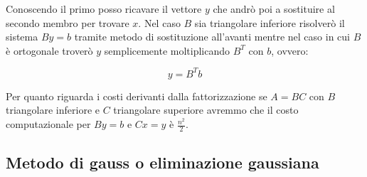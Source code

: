 \documentclass[12pt, a4paper]{book}
\theoremstyle{definition}
\begin{document}
\begin{flushleft}
Conoscendo il primo posso ricavare il vettore $y$ che andrò poi a sostituire al secondo membro per trovare $x$.  Nel caso $B$ sia triangolare inferiore risolverò il sistema $By = b$ tramite metodo di sostituzione all'avanti mentre nel caso in cui $B$ è ortogonale troverò $y$ semplicemente moltiplicando $B^{T}$ con $b$, ovvero:

 \[ 
		y = B^{T}b
\]

Per quanto riguarda i costi derivanti dalla fattorizzazione se $A = BC$ con $B$ triangolare inferiore e $C$ triangolare superiore avremmo che il costo computazionale per $By = b$ e  $Cx = y$ è $\frac{n^{2}}{2}$.
\end{flushleft}

\subsection{Metodo di gauss o eliminazione gaussiana}
\end{document}
